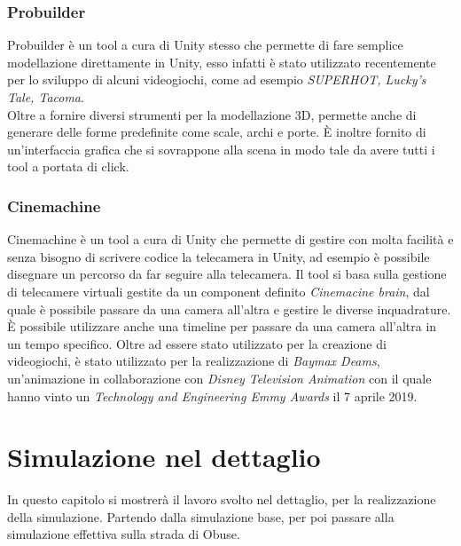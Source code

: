 \documentclass[12pt, openany]{book}
\begin{document}
	\subsection{Probuilder}
	Probuilder è un tool a cura di Unity stesso che permette di fare semplice modellazione direttamente in Unity, esso infatti è stato utilizzato recentemente per lo sviluppo di alcuni videogiochi, come ad esempio \emph{SUPERHOT, Lucky's Tale, Tacoma}.\\
	Oltre a fornire diversi strumenti per la modellazione 3D, permette anche di generare delle forme predefinite come scale, archi e porte. È inoltre fornito di un'interfaccia grafica che si sovrappone alla scena in modo tale da avere tutti i tool a portata di click.
	\subsection{Cinemachine}
	Cinemachine è un tool a cura di Unity che permette di gestire con molta facilità e senza bisogno di scrivere codice la telecamera in Unity, ad esempio è possibile disegnare un percorso da far seguire alla telecamera. Il tool si basa sulla gestione di telecamere virtuali gestite da un component definito \emph{Cinemacine brain}, dal quale è possibile passare da una camera all'altra e gestire le diverse inquadrature. È possibile utilizzare anche una timeline per passare da una camera all'altra in un tempo specifico. Oltre ad essere stato utilizzato per la creazione di videogiochi, è stato utilizzato per la realizzazione di \emph{Baymax Deams}, un'animazione in collaborazione con \emph{Disney Television Animation} con il quale hanno vinto un \emph{ Technology and Engineering Emmy Awards} il 7 aprile 2019.
	
	\chapter{Simulazione nel dettaglio}
	In questo capitolo si mostrerà il lavoro svolto nel dettaglio, per la realizzazione della simulazione. Partendo dalla simulazione base, per poi passare alla simulazione effettiva sulla strada di Obuse. 
\end{document}

